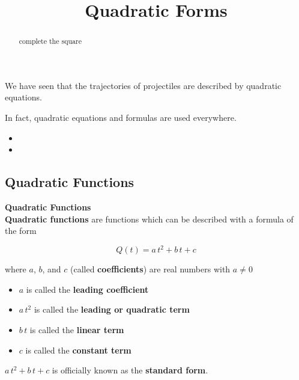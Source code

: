 \documentclass{ximera}
\title{Quadratic Forms}
\begin{document}
\begin{abstract}
complete the square
\end{abstract}
\maketitle



We have seen that the trajectories of projectiles are described by quadratic equations.  

In fact, quadratic equations and formulas are used everywhere.


\begin{itemize}
\item {}
\item {}
\end{itemize}







\subsection*{Quadratic Functions}


\begin{definition} \textbf{\textcolor{green!50!black}{Quadratic Functions}} \\
\textbf{Quadratic functions} are functions which can be described with a formula of the form

\[  Q(t) = a \, t^2 + b \, t + c  \]

where $a$, $b$, and $c$ (called \textbf{coefficients}) are real numbers with $a \ne 0$



\begin{itemize}
\item $a$ is called the \textbf{leading coefficient} 
\item $a \, t^2$ is called the \textbf{leading or quadratic term} 
\item $b \, t$ is called the \textbf{linear term} 
\item $c$ is called the \textbf{constant term} 
\end{itemize}

$a \, t^2 + b \, t + c $ is officially known as the \textbf{standard form}.

\end{definition}
\end{document}
